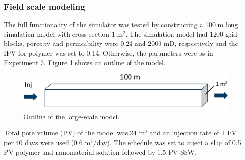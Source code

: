\documentclass[nanomaterials,article,submit,moreauthors,pdftex]{Definitions/mdpi}
\begin{document}


\subsubsection{Field scale modeling}
The full functionality of the simulator was tested by constructing a 100 m long simulation model with cross section 1 m$^2$. The simulation model had 1200 grid blocks, porosity and permeability were 0.24 and 2000 mD, respectively and the  IPV for polymer was set to 0.14. Otherwise, the parameters were as in Experiment 3. Figure \ref{fig:largeScaleModel} shows an outline of the model.
\begin{figure}[h!]
    \centering
    \includegraphics[width=.5\textwidth]{fig/largeScaleModel.png}
    \caption{Outline of the large-scale model. }
    \label{fig:largeScaleModel}
\end{figure}

Total pore volume (PV) of the model was 24 m$^3$ and an injection rate of 1 PV per 40 days were used (0.6 m$^3$/day). The schedule was set to inject a slug of 0.5 PV polymer and nanomaterial solution followed by 1.5 PV SSW. 
\end{document}
